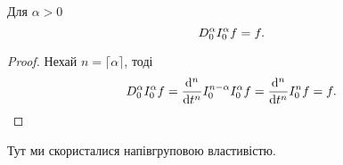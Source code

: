 
\begin{th_formula}
    Для $\alpha > 0$
    \begin{equation}
        D_0^{\alpha} I_0^{\alpha} f = f.
    \end{equation}
\end{th_formula}
\begin{proof}
    Нехай $n = \lceil \alpha \rceil$, тоді
    \begin{equation}
        D_0^{\alpha} I_0^{\alpha} f = \frac{\mathop{}\!\mathrm{d}^n}{\mathop{}\!\mathrm{d} t^n} I_0^{n - \alpha} I_0^{\alpha} f = \frac{\mathop{}\!\mathrm{d}^n}{\mathop{}\!\mathrm{d} t^n} I_0^{n} f = f. 
    \end{equation}
\end{proof}
\begin{remark}
    Тут ми скористалися напівгруповою властивістю.
\end{remark}

